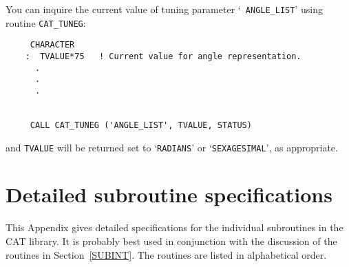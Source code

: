 You can inquire the current value of tuning parameter `{\tt
ANGLE\_LIST}' using routine {\tt CAT\_TUNEG}:

\begin{verbatim}
     CHARACTER
    :  TVALUE*75   ! Current value for angle representation.
      .
      .
      .


     CALL CAT_TUNEG ('ANGLE_LIST', TVALUE, STATUS)
\end{verbatim}

and {\tt TVALUE} will be returned set to `{\tt RADIANS}' or
`{\tt SEXAGESIMAL}', as appropriate.


\cleardoublepage
\appendix
\section{\label{DETAIL}Detailed subroutine specifications}

This Appendix gives detailed specifications for the individual
subroutines in the CAT library.  It is probably best used in conjunction
with the discussion of the routines in Section~\ref{SUBINT}. The
routines are listed in alphabetical order.

